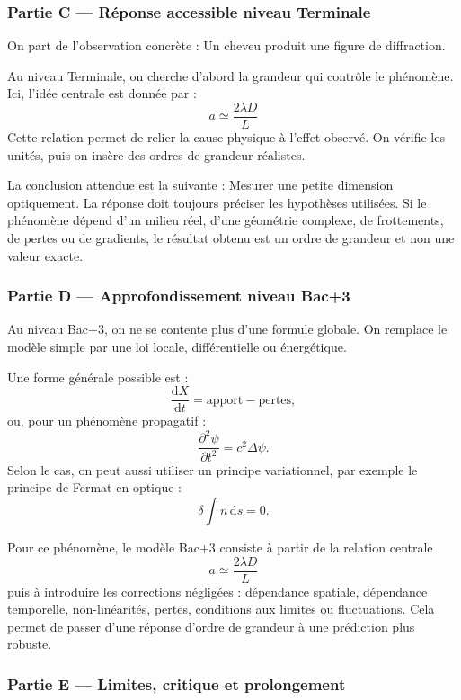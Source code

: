 \documentclass[11pt,a4paper]{article}
\begin{document}
\subsubsection*{Partie C — Réponse accessible niveau Terminale}

\begin{corrigebox}
On part de l'observation concrète : Un cheveu produit une figure de diffraction.

Au niveau Terminale, on cherche d'abord la grandeur qui contrôle le phénomène. Ici, l'idée centrale est donnée par :
\[
a\simeq\frac{2\lambda D}{L}
\]
Cette relation permet de relier la cause physique à l'effet observé. On vérifie les unités, puis on insère des ordres de grandeur réalistes.

La conclusion attendue est la suivante : Mesurer une petite dimension optiquement. La réponse doit toujours préciser les hypothèses utilisées. Si le phénomène dépend d'un milieu réel, d'une géométrie complexe, de frottements, de pertes ou de gradients, le résultat obtenu est un ordre de grandeur et non une valeur exacte.
\end{corrigebox}

\subsubsection*{Partie D — Approfondissement niveau Bac+3}

\begin{approfondissementbox}
Au niveau Bac+3, on ne se contente plus d'une formule globale. On remplace le modèle simple par une loi locale, différentielle ou énergétique.

Une forme générale possible est :
\[
\frac{\mathrm d X}{\mathrm dt}=\text{apport}-\text{pertes},
\]
ou, pour un phénomène propagatif :
\[
\frac{\partial^2 \psi}{\partial t^2}=c^2\Delta\psi.
\]
Selon le cas, on peut aussi utiliser un principe variationnel, par exemple le principe de Fermat en optique :
\[
\delta \int n\,\mathrm ds=0.
\]

Pour ce phénomène, le modèle Bac+3 consiste à partir de la relation centrale
\[
a\simeq\frac{2\lambda D}{L}
\]
puis à introduire les corrections négligées : dépendance spatiale, dépendance temporelle, non-linéarités, pertes, conditions aux limites ou fluctuations. Cela permet de passer d'une réponse d'ordre de grandeur à une prédiction plus robuste.
\end{approfondissementbox}

\subsubsection*{Partie E — Limites, critique et prolongement}
\end{document}

